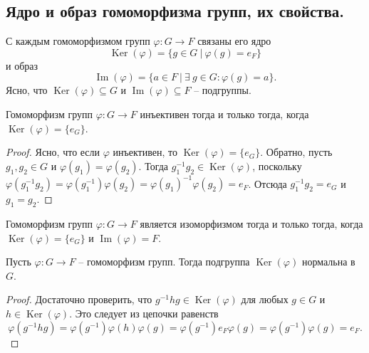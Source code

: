 \subsection{Ядро и образ гомоморфизма групп, их свойства.}
\begin{definition}
    С каждым гомоморфизмом групп $\varphi : G \to F$ связаны его ядро
    \[
        \operatorname{Ker}(\varphi) = \{g \in G \> | \> \varphi(g) = e_F \}
    \]
    и образ
    \[
        \operatorname{Im}(\varphi) = \{a \in F \> | \> \exists \> g \in G : \varphi(g) = a \}.
    \]
    Ясно, что $\operatorname{Ker}(\varphi) \subseteq G$ и $\operatorname{Im}(\varphi) \subseteq F$ -- подгруппы.
\end{definition}
\begin{lemma}
    Гомоморфизм групп $\varphi : G \to F$ инъективен тогда и только тогда, когда $\operatorname{Ker}(\varphi) = \{e_G\}$.
    \begin{proof}
        Ясно, что если $\varphi$ инъективен, то $\operatorname{Ker}(\varphi) = \{e_G\}$. Обратно, пусть $g_1, g_2 \in G$ и $\varphi(g_1) = \varphi(g_2)$. Тогда $g_1^{-1}g_2 \in \operatorname{Ker}(\varphi)$, поскольку $\varphi(g_1^{-1}g_2) = \varphi(g_1^{-1})\varphi(g_2) = \varphi(g_1)^{-1}\varphi(g_2) = e_F$. Отсюда $g_1^{-1}g_2 = e_G$ и $g_1 = g_2$.
    \end{proof}
\end{lemma}
\begin{consequence}
    Гомоморфизм групп $\varphi : G \to F$ является изоморфизмом тогда и только тогда, когда $\operatorname{Ker}(\varphi) = \{e_G\}$ и $\operatorname{Im}(\varphi) = F$.
\end{consequence}
\begin{statement}
    Пусть $\varphi : G \to F$ -- гомоморфизм групп. Тогда подгруппа $\operatorname{Ker}(\varphi)$ нормальна в $G$.
    \begin{proof}
        Достаточно проверить, что $g^{-1}hg \in \operatorname{Ker}(\varphi)$ для любых $g \in G$ и $h \in \operatorname{Ker}(\varphi)$. Это следует из цепочки равенств
        \[
            \varphi(g^{-1}hg) = \varphi(g^{-1})\varphi(h)\varphi(g) = \varphi(g^{-1})e_F\varphi(g) = \varphi(g^{-1})\varphi(g) = e_F.
        \]
    \end{proof}
\end{statement}